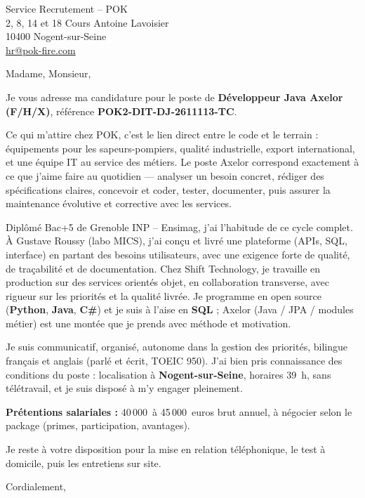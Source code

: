 \documentclass[a4paper,11pt]{letter}
\begin{document}
\begin{letter}{
Service Recrutement -- POK \\
2, 8, 14 et 18 Cours Antoine Lavoisier \\
10400 Nogent-sur-Seine \\
\href{mailto:hr@pok-fire.com}{hr@pok-fire.com}
}

\opening{Madame, Monsieur,}

Je vous adresse ma candidature pour le poste de \textbf{D\'eveloppeur Java Axelor (F/H/X)}, r\'ef\'erence \textbf{POK2-DIT-DJ-2611113-TC}.

Ce qui m'attire chez POK, c'est le lien direct entre le code et le terrain : \'equipements pour les sapeurs-pompiers, qualit\'e industrielle, export international, et une \'equipe IT au service des m\'etiers. Le poste Axelor correspond exactement \`a ce que j'aime faire au quotidien --- analyser un besoin concret, r\'ediger des sp\'ecifications claires, concevoir et coder, tester, documenter, puis assurer la maintenance \'evolutive et corrective avec les services.

Dipl\^om\'e Bac+5 de Grenoble INP -- Ensimag, j'ai l'habitude de ce cycle complet. \`A Gustave Roussy (labo MICS), j'ai con\c{c}u et livr\'e une plateforme (APIs, SQL, interface) en partant des besoins utilisateurs, avec une exigence forte de qualit\'e, de tra\c{c}abilit\'e et de documentation. Chez Shift Technology, je travaille en production sur des services orient\'es objet, en collaboration transverse, avec rigueur sur les priorit\'es et la qualit\'e livr\'ee. Je programme en open source (\textbf{Python}, \textbf{Java}, \textbf{C\#}) et je suis \`a l'aise en \textbf{SQL} ; Axelor (Java / JPA / modules m\'etier) est une mont\'ee que je prends avec m\'ethode et motivation.

Je suis communicatif, organis\'e, autonome dans la gestion des priorit\'es, bilingue fran\c{c}ais et anglais (parl\'e et \'ecrit, TOEIC 950). J'ai bien pris connaissance des conditions du poste : localisation \`a \textbf{Nogent-sur-Seine}, horaires 39~h, sans t\'el\'etravail, et je suis dispos\'e \`a m'y engager pleinement.

\textbf{Pr\'etentions salariales :} 40\,000~\`a 45\,000~euros brut annuel, \`a n\'egocier selon le package (primes, participation, avantages).

Je reste \`a votre disposition pour la mise en relation t\'el\'ephonique, le test \`a domicile, puis les entretiens sur site.

\closing{Cordialement,}

\end{letter}
\end{document}
